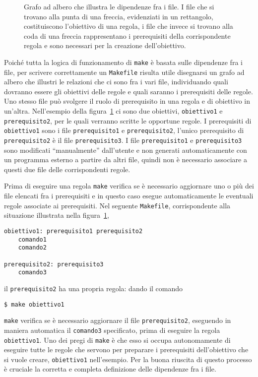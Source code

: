 \begin{figure}
  \centering
  \caption{Grafo ad albero che illustra le dipendenze fra i file.  I file che si
    trovano alla punta di una freccia, evidenziati in un rettangolo,
    costituiscono l'obiettivo di una regola, i file che invece si trovano alla
    coda di una freccia rappresentano i prerequisiti della corrispondente
    regola e sono necessari per la creazione dell'obiettivo.}
  \label{fig:grafo-albero1}
\end{figure}
Poiché tutta la logica di funzionamento di \texttt{make} è basata sulle
dipendenze fra i file, per scrivere correttamente un \texttt{Makefile} risulta
utile disegnarsi un grafo ad albero che illustri le relazioni che ci sono fra i
vari file, individuando quali dovranno essere gli obiettivi delle regole e quali
saranno i prerequisiti delle regole.  Uno stesso file può svolgere il ruolo di
prerequisito in una regola e di obiettivo in un'altra.  Nell'esempio della
figura~\ref{fig:grafo-albero1} ci sono due obiettivi, \texttt{obiettivo1} e
\texttt{prerequisito2}, per le quali verranno scritte le opportune regole.  I
prerequisiti di \texttt{obiettivo1} sono i file \texttt{prerequisito1} e
\texttt{prerequisito2}, l'unico prerequisito di \texttt{prerequisito2} è il file
\texttt{prerequisito3}.  I file \texttt{prerequisito1} e \texttt{prerequisito3}
sono modificati ``manualmente'' dall'utente e non generati automaticamente con
un programma esterno a partire da altri file, quindi non è necessario associare
a questi due file delle corrispondenti regole.

Prima di eseguire una regola \texttt{make} verifica se è necessario aggiornare
uno o più dei file elencati fra i prerequisiti e in questo caso esegue
automaticamente le eventuali regole associate ai prerequisiti.  Nel seguente
\texttt{Makefile}, corrispondente alla situazione illustrata nella
figura~\ref{fig:grafo-albero1},
\begin{lstlisting}
obiettivo1: prerequisito1 prerequisito2
	comando1
	comando2

prerequisito2: prerequisito3
	comando3
\end{lstlisting}
il \texttt{prerequisito2} ha una propria regola: dando il comando
\begin{verbatim}
$ make obiettivo1
\end{verbatim} %
\texttt{make} verifica se è necessario aggiornare il file
\texttt{prerequisito2}, eseguendo in maniera automatica il \texttt{comando3}
specificato, prima di eseguire la regola \texttt{obiettivo1}.  Uno dei pregi di
\texttt{make} è che esso si occupa autonomamente di eseguire tutte le regole che
servono per preparare i prerequisiti dell'obiettivo che si vuole creare,
\texttt{obiettivo1} nell'esempio.  Per la buona riuscita di questo processo è
cruciale la corretta e completa definizione delle dipendenze fra i file.

